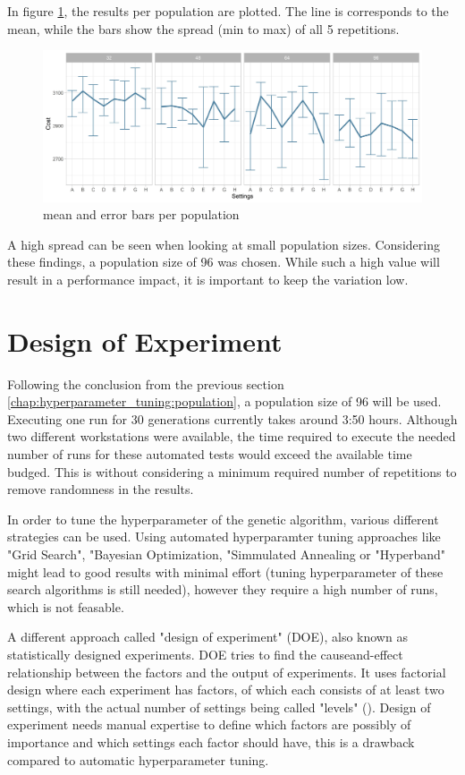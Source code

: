 In figure \ref{figure:population:results}, the results per population are plotted. The line is corresponds to the mean, while the bars show the spread (min to max) of all 5 repetitions.
\begin{figure}[ht] 
	\includegraphics[width=1\linewidth]{simulations/population/plots/comparison}
	\caption{mean and error bars per population}
		\label{figure:population:results}
\end{figure}


A high spread can be seen when looking at small population sizes. Considering these findings, a population size of 96 was chosen. While such a high value will result in a performance impact, it is important to keep the variation low.


\section{Design of Experiment}
\label{chap:hyperparameter_tuning:other_parameter}

Following the conclusion from the previous section \ref{chap:hyperparameter_tuning:population}, a population size of 96 will be used. Executing one run for 30 generations currently takes around 3:50 hours. Although two different workstations were available, the time required to execute the needed number of runs for these automated tests would exceed the available time budged. This is without considering a minimum required number of repetitions to remove randomness in the results.

In order to tune the hyperparameter of the genetic algorithm, various different strategies can be used. Using automated hyperparamter tuning approaches like "Grid Search", "Bayesian Optimization, "Simmulated Annealing or "Hyperband" might lead to good results with minimal effort (tuning hyperparameter of these search algorithms is still needed), however they require a high number of runs, which is not feasable. 

A different approach called "design of experiment" (DOE), also known as statistically designed experiments. DOE tries to find the causeand-effect relationship between the factors and the output of experiments.
It uses factorial design where each experiment has factors, of which each consists of at least two settings, with the actual number of settings being called "levels" (\cite{yang_design_2009}). Design of experiment needs manual expertise to define which factors are possibly of importance and which settings each factor should have, this is a drawback compared to automatic hyperparameter tuning.

